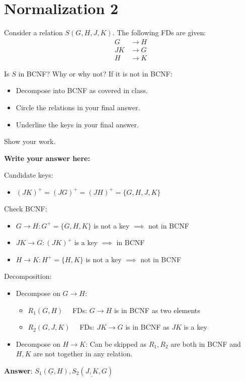 \documentclass{article}
\begin{document}
\section*{Normalization 2}

Consider a relation $S(G, H, J, K)$. The following FDs are given:
\begin{align}
    G  & \to H \\
    JK & \to G \\
    H  & \to K
\end{align}

Is $S$ in BCNF? Why or why not? If it is not in BCNF:
\begin{itemize}
    \item Decompose into BCNF as covered in class.
    \item Circle the relations in your final answer.
    \item Underline the keys in your final answer.
\end{itemize}

Show your work.

\textbf{Write your answer here:}

Candidate keys:

\begin{itemize}
    \item $(JK)^+ = (JG)^+ = (JH)^+ = \{G, H, J, K\}$
\end{itemize}

Check BCNF:

\begin{itemize}
    \item $G\to H: G^+ = \{G, H, K\}$ is not a key $\implies$ not in BCNF
    \item $JK \to G: (JK)^+$ is a key $\implies$ in BCNF
    \item $H \to K: H^+ = \{H, K\}$ is not a key $\implies$ not in BCNF
\end{itemize}

Decomposition:

\begin{itemize}
    \item Decompose on $G \to H$:
          \begin{itemize}
              \item $R_1(G,H) \quad$ FDs: $G \to H$ is in BCNF as two elements
              \item $R_2(G,J,K) \quad$ FDs: $JK \to G$ is in BCNF     as $JK$ is a key
          \end{itemize}
    \item Decompose on $H \to K$: Can be skipped as $R_1,R_2$ are both in BCNF and $H,K$ are not together in any relation.
\end{itemize}

\textbf{Answer}: $S_1(\underline{G}, H), S_2(\underline{J, K}, G)$
\end{document}
